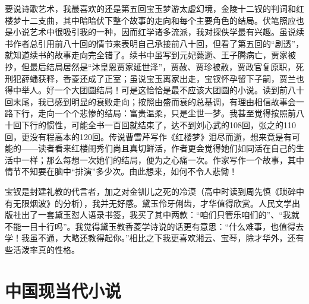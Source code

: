 \par 要说诗歌艺术，我最喜欢的还是第五回宝玉梦游太虚幻境，金陵十二钗的判词和红楼梦十二支曲，其中暗暗伏下整个故事的走向和每个主要角色的结局。伏笔照应也是小说艺术中很吸引我的一种，因而红学诸多流派，我对探佚学最有兴趣。虽说续书作者总引用前八十回的情节来表明自己承接前八十回，但看了第五回的“剧透”，就知道续书的故事走向完全错了。续书中虽写到元妃薨逝、王子腾病亡，贾家被抄，但最后结局居然是“沐皇恩贾家延世泽”，贾赦、贾珍被赦，贾政官复原职，死刑犯薛蟠获释，香菱还成了正室；虽说宝玉离家出走，宝钗怀孕留下子嗣，贾兰也得中举人。好一个大团圆结局！可是这恰恰是最不应该大团圆的小说。读到前八十回末尾，我已感到明显的衰败走向；按照由盛而衰的总基调，有理由相信故事会一路下行，走向一个个悲惨的结局：富贵温柔，只是尘世一梦。我甚至觉得按照前八十回下行的惯性，可能全书一百回就结束了，达不到刘心武的108回，张之的110回，更没有程高本的120回。传说曹雪芹写作《红楼梦》泪尽而逝，想来竟是有可能的——读者看来红楼闺秀们尚且真切鲜活，作者更会觉得她们如同活在自己的生活中一样；那么每想一次她们的结局，便为之心痛一次。作家写作一个故事，其中情节不知要在脑中“排演”多少次。由此想来，如何不令人悲恸！
\par 宝钗是封建礼教的代言者，加之对金钏儿之死的冷漠（高中时读到周先慎《琐碎中有无限烟波》的分析），我并无好感。黛玉伶牙俐齿，才华值得欣赏。人民文学出版社出了一套黛玉怼人语录书签，我买了其中两款：“咱们只管乐咱们的”、“我就不能一目十行吗”。我觉得黛玉教香菱学诗说的话更有意思：“什么难事，也值得去学！我虽不通，大略还教得起你。”相比之下我更喜欢湘云、宝琴，除才华外，还有些活泼率真的性格。
\par {}

\section{中国现当代小说}


